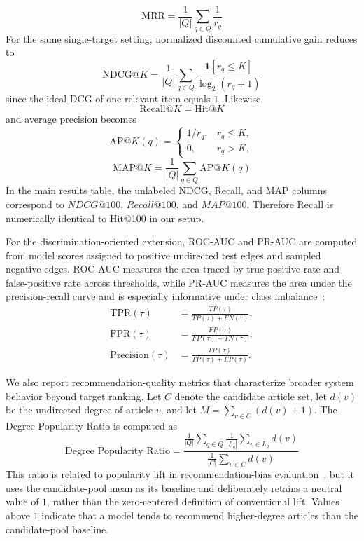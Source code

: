 \documentclass[runningheads]{llncs}
\begin{document}
\begin{equation}
\text{MRR} = \frac{1}{|Q|}\sum_{q \in Q} \frac{1}{r_q}
\end{equation}
For the same single-target setting, normalized discounted cumulative gain
reduces to
\begin{equation}
\text{NDCG@}K = \frac{1}{|Q|}\sum_{q \in Q}
\frac{\mathbf{1}[r_q \le K]}{\log_2(r_q + 1)}
\end{equation}
since the ideal DCG of one relevant item equals \(1\). Likewise,
\begin{equation}
\text{Recall@}K = \text{Hit@}K
\end{equation}
and average precision becomes
\begin{equation}
\text{AP@}K(q) =
\begin{cases}
1/r_q, & r_q \le K,\\
0, & r_q > K,
\end{cases}
\end{equation}
\begin{equation}
\text{MAP@}K = \frac{1}{|Q|}\sum_{q \in Q} \text{AP@}K(q)
\end{equation}
In the main results table, the unlabeled NDCG, Recall, and MAP columns
correspond to \(NDCG@100\), \(Recall@100\), and \(MAP@100\). Therefore Recall
is numerically identical to Hit@100 in our setup.

For the discrimination-oriented extension, ROC-AUC and PR-AUC are computed from
model scores assigned to positive undirected test edges and sampled negative
edges. ROC-AUC measures the area traced by true-positive rate and false-positive
rate across thresholds, while PR-AUC measures the area under the
precision-recall curve and is especially informative under class
imbalance~\cite{saito2015pr}:
\begin{equation}
\begin{aligned}
\text{TPR}(\tau) &= \frac{TP(\tau)}{TP(\tau)+FN(\tau)}, \\
\text{FPR}(\tau) &= \frac{FP(\tau)}{FP(\tau)+TN(\tau)}, \\
\text{Precision}(\tau) &= \frac{TP(\tau)}{TP(\tau)+FP(\tau)}.
\end{aligned}
\end{equation}

We also report recommendation-quality metrics that characterize broader system
behavior beyond target ranking. Let \(C\) denote the candidate article set,
let \(d(v)\) be the undirected degree of article \(v\), and let
\(M = \sum_{v \in C}(d(v)+1)\). The Degree Popularity Ratio is computed as
\begin{equation}
\text{Degree Popularity Ratio} =
\frac{\frac{1}{|Q|}\sum_{q \in Q}\frac{1}{|L_q|}\sum_{v \in L_q} d(v)}
{\frac{1}{|C|}\sum_{v \in C} d(v)}
\end{equation}
This ratio is related to popularity lift in recommendation-bias
evaluation~\cite{kowald2023popularity}, but it uses the candidate-pool mean as
its baseline and deliberately retains a neutral value of \(1\), rather than the
zero-centered definition of conventional lift. Values above \(1\) indicate
that a model tends to recommend higher-degree articles than the candidate-pool
baseline.
\end{document}

